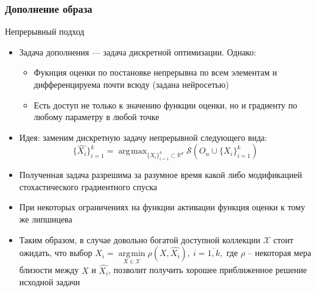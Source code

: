 \documentclass[10pt]{beamer}
\DeclareMathOperator*{\argmax}{\arg\!\max}
\DeclareMathOperator*{\argmin}{\arg\!\min}
\begin{document}
\begin{frame}
	\frametitle{Дополнение образа}
	\begin{block}{Непрерывный подход}
		\begin{itemize}
			\item Задача дополнения --- задача дискретной оптимизации. Однако:
				\begin{itemize}
					\item Фукнция оценки по постановке непрерывна по всем элементам и дифференцируема почти всюду (задана нейросетью)
					\item Есть доступ не только к значению функции оценки, но и градиенту по любому параметру в любой точке
				\end{itemize}
			\item Идея: заменим дискретную задачу непрерывной следующего вида:
			 	$$\{\hat{X_i}\}_{i=1}^k= \argmax_{\{X_i\}_{i=1}^k\subset\mathbb{R}^d} \mathcal{S}\left(O_n\cup\{X_i\}_{i=1}^k\right)$$
			 \item Полученная задача разрешима за разумное время какой либо модификацией стохастического градиентного спуска
			 \item При некоторых ограничениях на функции активации функция оценки к тому же липшицева
			 \item Таким образом, в случае довольно богатой доступной коллекции $\mathcal{X}$ стоит ожидать, что выбор 
			 $X_i = \argmin\limits_{X\in\mathcal{X}}\rho(X, \hat{X_i}),~i=\overline{1,k},$
			 где $\rho$ -- некоторая мера близости между $X$ и $\hat{X_i}$, позволит получить хорошее приближенное решение исходной задачи
		 	
		\end{itemize}
	\end{block}
\end{frame}
\end{document}
